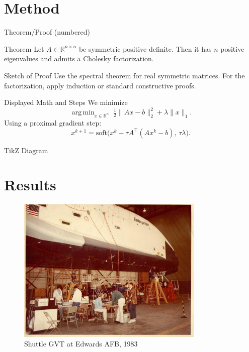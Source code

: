 \documentclass[aspectratio=169,10pt]{beamer} \mode<presentation>
\newcommand{\R}{\mathbb{R}}
\DeclareMathOperator*{\argmin}{arg\,min}
\begin{document}
\section{Method}

\begin{frame}[t]{Theorem/Proof (numbered)}
\begin{block}{Theorem}
Let $A\in\R^{n\times n}$ be symmetric positive definite. Then it has $n$ positive eigenvalues and admits a Cholesky factorization.
\end{block}

\begin{exampleblock}{Sketch of Proof}
Use the spectral theorem for real symmetric matrices. For the factorization, apply induction or standard constructive proofs.
\end{exampleblock}
\end{frame}

\begin{frame}{Displayed Math and Steps}
We minimize
\[
  \argmin_{x\in\R^n} \; \tfrac12\|Ax-b\|_2^2 + \lambda\|x\|_1.
\]
\pause
Using a proximal gradient step:
\[
  x^{k+1} = \mathrm{soft}\bigl(x^k - \tau A^\top(Ax^k-b),\, \tau\lambda\bigr).
\]
\end{frame}

\begin{frame}{TikZ Diagram}
\centering
{}
\end{frame}

\section{Results}

\begin{frame}
  \begin{figure}
    \centering
    \includegraphics[width=0.65\linewidth,height=7cm]{SDRC-shuttle-1983}
    \caption{Shuttle GVT at Edwards AFB, 1983}
  \end{figure}
\end{frame}
\end{document}
